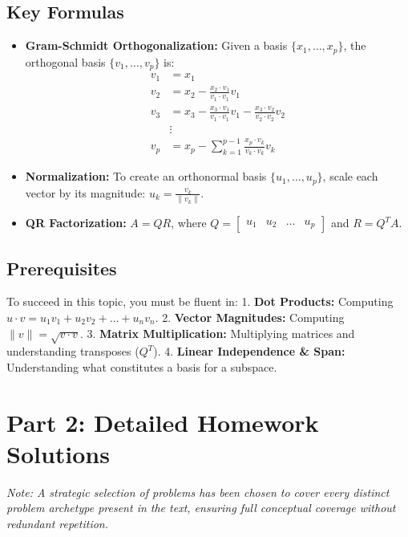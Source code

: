 \documentclass[11pt, letterpaper]{article}
\theoremstyle{definition}
\theoremstyle{remark}
\begin{document}
\subsection{Key Formulas}
\begin{itemize}
    \item \textbf{Gram-Schmidt Orthogonalization:} Given a basis $\{x_1, \dots, x_p\}$, the orthogonal basis $\{v_1, \dots, v_p\}$ is:
    \begin{align*}
        v_1 &= x_1 \\
        v_2 &= x_2 - \frac{x_2 \cdot v_1}{v_1 \cdot v_1}v_1 \\
        v_3 &= x_3 - \frac{x_3 \cdot v_1}{v_1 \cdot v_1}v_1 - \frac{x_3 \cdot v_2}{v_2 \cdot v_2}v_2 \\
        &\vdots \\
        v_p &= x_p - \sum_{k=1}^{p-1} \frac{x_p \cdot v_k}{v_k \cdot v_k}v_k
    \end{align*}
    \item \textbf{Normalization:} To create an orthonormal basis $\{u_1, \dots, u_p\}$, scale each vector by its magnitude: $u_k = \frac{v_k}{\|v_k\|}$.
    \item \textbf{QR Factorization:} $A = QR$, where $Q = \begin{bmatrix} u_1 & u_2 & \dots & u_p \end{bmatrix}$ and $R = Q^T A$.
\end{itemize}

\subsection{Prerequisites}
To succeed in this topic, you must be fluent in:
1. \textbf{Dot Products:} Computing $u \cdot v = u_1v_1 + u_2v_2 + \dots + u_nv_n$.
2. \textbf{Vector Magnitudes:} Computing $\|v\| = \sqrt{v \cdot v}$.
3. \textbf{Matrix Multiplication:} Multiplying matrices and understanding transposes ($Q^T$).
4. \textbf{Linear Independence \& Span:} Understanding what constitutes a basis for a subspace.

\newpage
\section{Part 2: Detailed Homework Solutions}

\textit{Note: A strategic selection of problems has been chosen to cover every distinct problem archetype present in the text, ensuring full conceptual coverage without redundant repetition.}
\end{document}
